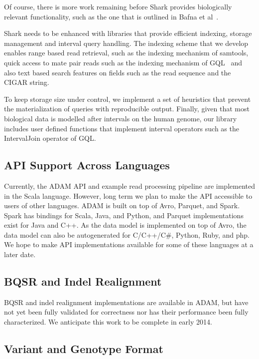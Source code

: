 \documentclass[10pt,twocolumn]{article}
\theoremstyle{plain}
\begin{document}
Of course, there is more work remaining before Shark provides biologically relevant functionality,
such as the one that is outlined in Bafna et al~\cite{bafna2013}.

Shark needs to be enhanced with libraries that provide
efficient indexing, storage management and interval query handling. The indexing scheme that we develop enables
range based read retrieval, such as the indexing mechanism of samtools, quick access to mate pair reads such as the
indexing mechanism of GQL~\cite{kozanitis13} and also text based search features on fields such as the read sequence
and the CIGAR string. 

To keep storage size under control, we implement a set of heuristics that prevent the materialization of
queries with reproducible output. Finally, given that most biological data is modelled after intervals on the human genome,
our library includes user defined functions that implement interval operators such as the IntervalJoin operator of GQL.

\subsection{API Support Across Languages}
\label{sec:api-support-across-languages}

Currently, the ADAM API and example read processing pipeline are implemented in the Scala language. However, long
term we plan to make the API accessible to users of other languages. ADAM is built on top of Avro, Parquet, and Spark.
Spark has bindings for Scala, Java, and Python, and Parquet implementations exist for Java and C++. As the data model
is implemented on top of Avro, the data model can also be auto\-generated for C/C++/C\#, Python, Ruby, and php. We hope
to make API implementations available for some of these languages at a later date.

\subsection{BQSR and Indel Realignment}
\label{sec:future-bqsr-ir}

BQSR and indel realignment implementations are available in ADAM, but have not yet been fully validated for correctness
nor has their performance been fully characterized. We anticipate this work to be complete in early 2014.

\subsection{Variant and Genotype Format}
\label{sec:variant-genotype-format-future}
\end{document}
